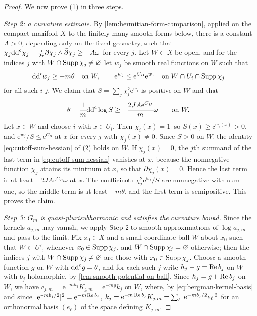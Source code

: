 \begin{proof}
We now prove (1) in three steps.

\emph{Step 2: a curvature estimate.} By \cref{lem:hermitian-form-comparison}, applied on the compact manifold $X$ to the finitely many smooth forms below, there is a constant $A>0$, depending only on the fixed geometry, such that $\chi_j\mathrm{dd}^{\mathrm{c}}\chi_j-\frac{\mathrm i}{2\pi}\partial\chi_j\wedge\bar\partial\chi_j\geq-A\omega$ for every $j$. Let $W\subset X$ be open, and for the indices $j$ with $W\cap\operatorname{Supp}\chi_j\neq\varnothing$ let $w_j$ be smooth real functions on $W$ such that
\[
 \mathrm{dd}^{\mathrm{c}} w_j\geq-m\theta\quad\text{on }W,\qquad
 \mathrm e^{w_j}\leq\mathrm e^{C_B}\mathrm e^{w_i}\quad\text{on }W\cap U_i\cap\operatorname{Supp}\chi_j
\]
for all such $i,j$. We claim that $S=\sum_j\chi_j^2\mathrm e^{w_j}$ is positive on $W$ and that
\[
 \theta+\frac1m\mathrm{dd}^{\mathrm{c}}\log S\geq-\frac{2JA\mathrm e^{C_B}}m\omega\qquad\text{on }W.
\]
Let $x\in W$ and choose $i$ with $x\in U_i$. Then $\chi_i(x)=1$, so $S(x)\geq\mathrm e^{w_i(x)}>0$, and $\mathrm e^{w_j}/S\leq\mathrm e^{C_B}$ at $x$ for every $j$ with $\chi_j(x)\neq0$. Since $S>0$ on $W$, the identity \eqref{eq:cutoff-sum-hessian} of (2) holds on $W$. If $\chi_j(x)=0$, the $j$th summand of the last term in \eqref{eq:cutoff-sum-hessian} vanishes at $x$, because the nonnegative function $\chi_j$ attains its minimum at $x$, so that $\partial\chi_j(x)=0$. Hence the last term is at least $-2JA\mathrm e^{C_B}\omega$ at $x$. The coefficients $\chi_j^2\mathrm e^{w_j}/S$ are nonnegative with sum one, so the middle term is at least $-m\theta$, and the first term is semipositive. This proves the claim.

\emph{Step 3: $G_m$ is quasi-plurisubharmonic and satisfies the curvature bound.} Since the kernels $a_{j,m}$ may vanish, we apply Step 2 to smooth approximations of $\log a_{j,m}$ and pass to the limit. Fix $x_0\in X$ and a small coordinate ball $W$ about $x_0$ such that $W\subset U'_j$ whenever $x_0\in\operatorname{Supp}\chi_j$, and $W\cap\operatorname{Supp}\chi_j=\varnothing$ otherwise; then the indices $j$ with $W\cap\operatorname{Supp}\chi_j\neq\varnothing$ are those with $x_0\in\operatorname{Supp}\chi_j$. Choose a smooth function $g$ on $W$ with $\mathrm{dd}^{\mathrm{c}} g=\theta$, and for each such $j$ write $h_j-g=\operatorname{Re} b_j$ on $W$ with $b_j$ holomorphic, by \cref{lem:smooth-potential-on-ball}. Since $h_j=g+\operatorname{Re} b_j$ on $W$, we have $a_{j,m}=\mathrm e^{-mh_j}K_{j,m}=\mathrm e^{-mg}k_j$ on $W$, where, by \eqref{eq:bergman-kernel-basis} and since $|\mathrm e^{-mb_j/2}|^2=\mathrm e^{-m\operatorname{Re} b_j}$, $k_j=\mathrm e^{-m\operatorname{Re} b_j}K_{j,m}=\sum_\ell|\mathrm e^{-mb_j/2}e_\ell|^2$ for an orthonormal basis $(e_\ell)$ of the space defining $K_{j,m}$.


\end{proof}
